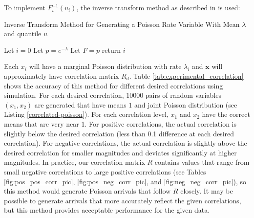 To implement $F^{-1}_i(u_i)$, the inverse transform method as described in \cite{B1} is used:
$$ $$

\begin{algorithm}[H]
\SetAlgoLined
\caption{Inverse Transform Method for Generating a Poisson Rate Variable With Mean $\lambda$ and quantile $u$}
 Let $i = 0$ \;
 Let $p = e^{-\lambda}$ \;
 Let $F = p$ \;
 return $i$ \;
\end{algorithm}

Each $x_i$ will have a marginal Poisson distribution with rate $\lambda_i$ and $\boldsymbol{x}$ will approximately have correlation matrix $R_d$. Table \ref{tab:experimental_correlation} shows the accuracy of this method for different desired correlations using simulation. For each desired correlation, 10000 pairs of random variables $(x_1,x_2)$ are generated that have means $1$ and joint Poisson distribution (see Listing \ref{correlated-poisson}). For each correlation level, $x_1$ and $x_2$ have the correct means that are very near 1. For positive correlations, the actual correlation is slightly below the desired correlation (less than 0.1 difference at each desired correlation). For negative correlations, the actual correlation is slightly above the desired correlation for smaller magnitudes and deviates significantly at higher magnitudes. In practice, our correlation matrix $R$ contains values that range from small negative correlations to large positive correlations (see Tables \ref{fig:pos_pos_corr_pic}, \ref{fig:pos_neg_corr_pic}, and \ref{fig:neg_neg_corr_pic}), so this method would generate Poisson arrivals that follow $R$ closely. It may be possible to generate arrivals that more accurately reflect the given correlations, but this method provides acceptable performance for the given data.

